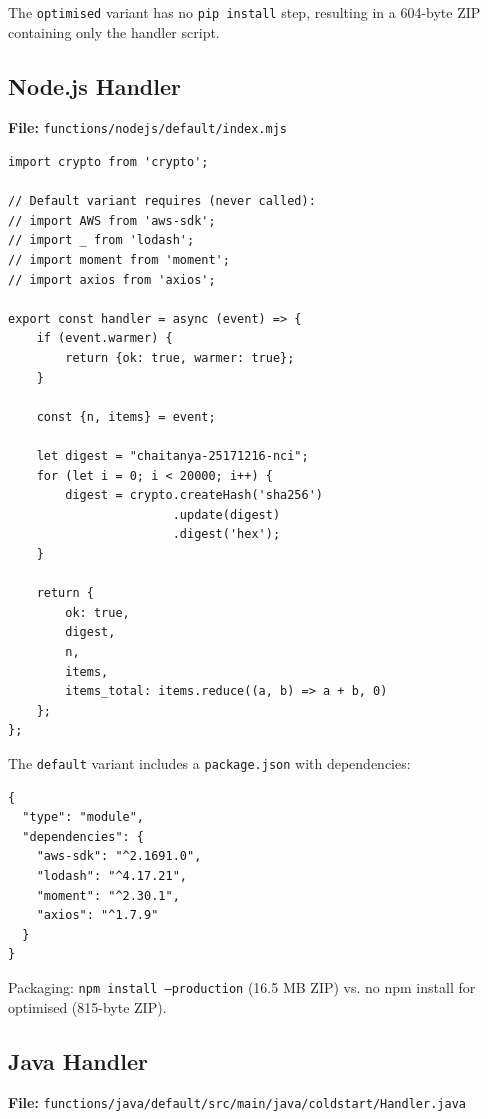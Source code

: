 The \texttt{optimised} variant has no \texttt{pip install} step, resulting in a 604-byte ZIP containing only the handler script.

\subsection{Node.js Handler}

\textbf{File:} \texttt{functions/nodejs/default/index.mjs}

\begin{verbatim}
import crypto from 'crypto';

// Default variant requires (never called):
// import AWS from 'aws-sdk';
// import _ from 'lodash';
// import moment from 'moment';
// import axios from 'axios';

export const handler = async (event) => {
    if (event.warmer) {
        return {ok: true, warmer: true};
    }
    
    const {n, items} = event;
    
    let digest = "chaitanya-25171216-nci";
    for (let i = 0; i < 20000; i++) {
        digest = crypto.createHash('sha256')
                       .update(digest)
                       .digest('hex');
    }
    
    return {
        ok: true,
        digest,
        n,
        items,
        items_total: items.reduce((a, b) => a + b, 0)
    };
};
\end{verbatim}

The \texttt{default} variant includes a \texttt{package.json} with dependencies:
\begin{verbatim}
{
  "type": "module",
  "dependencies": {
    "aws-sdk": "^2.1691.0",
    "lodash": "^4.17.21",
    "moment": "^2.30.1",
    "axios": "^1.7.9"
  }
}
\end{verbatim}

Packaging: \texttt{npm install --production} (16.5 MB ZIP) vs. no npm install for optimised (815-byte ZIP).

\subsection{Java Handler}

\textbf{File:} \texttt{functions/java/default/src/main/java/coldstart/Handler.java}


